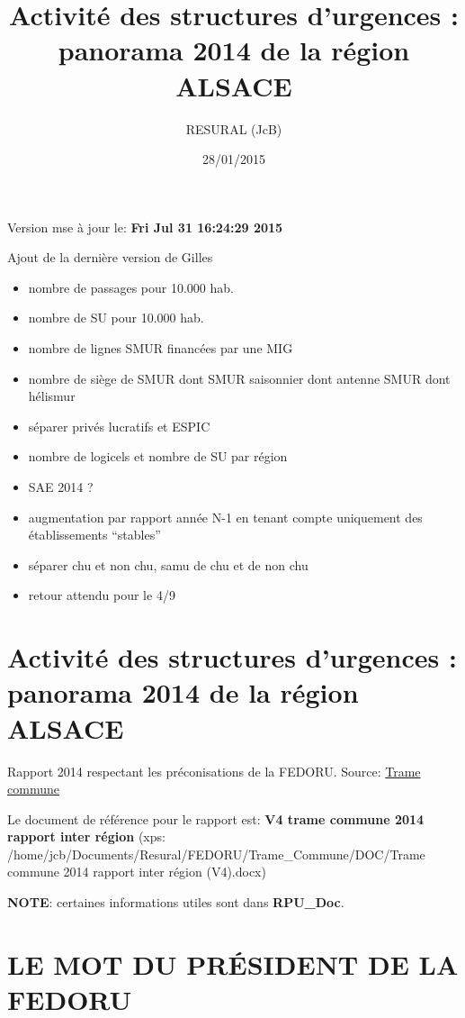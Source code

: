 \documentclass[]{article}
\title{Activité des structures d'urgences : panorama 2014 de la région ALSACE}
\author{RESURAL (JcB)}
\date{28/01/2015}
\begin{document}
\maketitle


{
\hypersetup{linkcolor=black}
\setcounter{tocdepth}{2}
\tableofcontents
}
Version mse à jour le: \textbf{Fri Jul 31 16:24:29 2015}

Ajout de la dernière version de Gilles

\begin{itemize}
\itemsep1pt\parskip0pt
\item
  nombre de passages pour 10.000 hab.
\item
  nombre de SU pour 10.000 hab.
\item
  nombre de lignes SMUR financées par une MIG
\item
  nombre de siège de SMUR dont SMUR saisonnier dont antenne SMUR dont
  hélismur
\item
  séparer privés lucratifs et ESPIC
\item
  nombre de logicels et nombre de SU par région
\item
  SAE 2014 ?
\item
  augmentation par rapport année N-1 en tenant compte uniquement des
  établissements ``stables''
\item
  séparer chu et non chu, samu de chu et de non chu
\item
  retour attendu pour le 4/9
\end{itemize}

\section{Activité des structures d'urgences : panorama 2014 de la région
ALSACE}\label{activite-des-structures-durgences-panorama-2014-de-la-region-alsace}

Rapport 2014 respectant les préconisations de la FEDORU. Source:
\href{https://docs.google.com/document/d/101LYVqVLeHZnrujfMm3aqBYfbOwx3CPEB3Y-Lbud2Ls/edit}{Trame
commune}

Le document de référence pour le rapport est: \textbf{V4 trame commune
2014 rapport inter région} (xps:
/home/jcb/Documents/Resural/FEDORU/Trame\_Commune/DOC/Trame commune 2014
rapport inter région (V4).docx)

\textbf{NOTE}: certaines informations utiles sont dans
\textbf{RPU\_Doc}.

\section{LE MOT DU PRÉSIDENT DE LA
FEDORU}\label{le-mot-du-president-de-la-fedoru}
\end{document}
